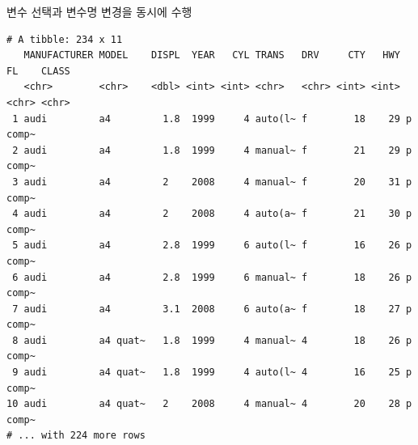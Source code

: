 \documentclass[
  11pt,
]{krantz}
\makeatletter
\newenvironment{Shaded}{\begin{snugshade}}{\end{snugshade}}
\newcommand{\CommentTok}[1]{\textcolor[rgb]{0.37,0.37,0.37}{\textit{#1}}}
\newcommand{\KeywordTok}[1]{\textcolor[rgb]{0.27,0.27,0.27}{\textbf{#1}}}
\newcommand{\NormalTok}[1]{#1}
\newcommand{\OperatorTok}[1]{\textcolor[rgb]{0.43,0.43,0.43}{\textbf{#1}}}
\newcommand{\StringTok}[1]{\textcolor[rgb]{0.5,0.5,0.5}{#1}}
\newenvironment{kframe}{%
\medskip{}
\setlength{\fboxsep}{.8em}
 \def\at@end@of@kframe{}%
 \ifinner\ifhmode%
  \def\at@end@of@kframe{\end{minipage}}%
  \begin{minipage}{\columnwidth}%
 \fi\fi%
 \def\FrameCommand##1{\hskip\@totalleftmargin \hskip-\fboxsep
 \colorbox{shadecolor}{##1}\hskip-\fboxsep
     \hskip-\linewidth \hskip-\@totalleftmargin \hskip\columnwidth}%
 \MakeFramed {\advance\hsize-\width
   \@totalleftmargin\z@ \linewidth\hsize
   \@setminipage}}%
 {\par\unskip\endMakeFramed%
 \at@end@of@kframe}
\renewenvironment{quote}{\begin{kframe}}{\end{kframe}}
\makeatother
\begin{document}
\begin{quote}
변수 선택과 변수명 변경을 동시에 수행
\end{quote}

\footnotesize

\begin{Shaded}
\end{Shaded}

\begin{verbatim}
# A tibble: 234 x 11
   MANUFACTURER MODEL    DISPL  YEAR   CYL TRANS   DRV     CTY   HWY FL    CLASS
   <chr>        <chr>    <dbl> <int> <int> <chr>   <chr> <int> <int> <chr> <chr>
 1 audi         a4         1.8  1999     4 auto(l~ f        18    29 p     comp~
 2 audi         a4         1.8  1999     4 manual~ f        21    29 p     comp~
 3 audi         a4         2    2008     4 manual~ f        20    31 p     comp~
 4 audi         a4         2    2008     4 auto(a~ f        21    30 p     comp~
 5 audi         a4         2.8  1999     6 auto(l~ f        16    26 p     comp~
 6 audi         a4         2.8  1999     6 manual~ f        18    26 p     comp~
 7 audi         a4         3.1  2008     6 auto(a~ f        18    27 p     comp~
 8 audi         a4 quat~   1.8  1999     4 manual~ 4        18    26 p     comp~
 9 audi         a4 quat~   1.8  1999     4 auto(l~ 4        16    25 p     comp~
10 audi         a4 quat~   2    2008     4 manual~ 4        20    28 p     comp~
# ... with 224 more rows
\end{verbatim}

\begin{Shaded}
\end{Shaded}
\end{document}
